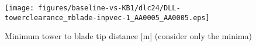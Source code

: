\begin{figure}[!ht]
\begin{center}
	\texttt{[image: figures/baseline-vs-KB1/dlc24/DLL-towerclearance\_mblade-inpvec-1\_AA0005\_AA0005.eps]}
\end{center}
\caption{Minimum tower to blade tip distance [m] (consider only the minima)}
\label{fig:baseline-vs-KB1:dlc24:tower-tip-clearance}
\end{figure}

